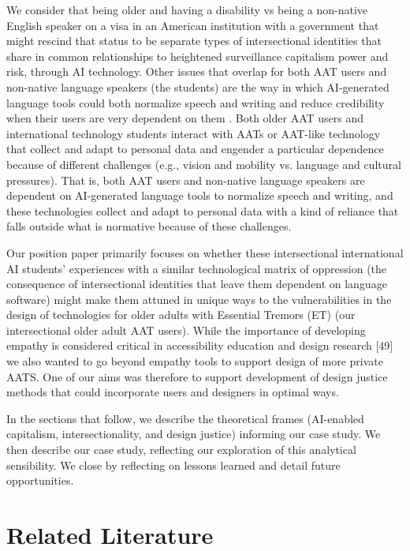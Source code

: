 \documentclass[11pt,dvipdfm]{article}
\begin{document}
We consider that being older and having a disability vs being a non-native English speaker on a visa in an American institution with a government that might rescind that status to be separate types of intersectional identities that share in common relationships to heightened surveillance capitalism power and risk, through AI technology. Other issues that overlap for both AAT users and non-native language speakers (the students) are the way in which AI-generated language tools could both normalize speech and writing and reduce credibility when their users are very dependent on them \cite{26}. Both older AAT users and international technology students interact with AATs or AAT-like technology that collect and adapt to personal data and engender a particular dependence because of different challenges (e.g., vision and mobility vs. language and cultural pressures). That is, both AAT users and non-native language speakers are dependent on AI-generated language tools to normalize speech and writing, and these technologies collect and adapt to personal data with a kind of reliance that falls outside what is normative because of these challenges. 

Our position paper primarily focuses on whether these intersectional international AI students’ experiences with a similar technological matrix of oppression (the consequence of intersectional identities that leave them dependent on language software) might make them attuned in unique ways to the vulnerabilities in the design of technologies for older adults with Essential Tremors (ET) (our intersectional older adult AAT users). While the importance of developing empathy is considered critical in accessibility education and design research [49] we also wanted to go beyond empathy tools to support design of more private AATS. One of our aims was therefore to support development of design justice methods that could incorporate users and designers in optimal ways.

In the sections that follow, we describe the theoretical frames (AI-enabled capitalism, intersectionality, and design justice) informing our case study. We then describe our case study, reflecting our exploration of this analytical sensibility. We close by reflecting on lessons learned and detail future opportunities. 

\section{Related Literature}
\end{document}
